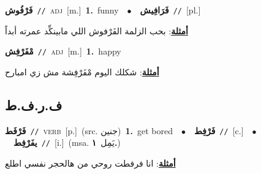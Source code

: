 \documentclass[10pt,a4paper,twoside]{article} %
\begin{document}
\begin{multicols}{2}
{\setlength\topsep{0pt}\textbf{\foreignlanguage{arabic}{فَرْفُوش}}\ {\color{gray}\texttt{//}\color{black}}\ \textsc{adj}\ [m.]\ \textbf{1.}~funny\ \ $\bullet$\ \ \setlength\topsep{0pt}\textbf{\foreignlanguage{arabic}{فَرَافِيش}}\ {\color{gray}\texttt{//}\color{black}}\ [pl.]\  \begin{flushright}\color{gray}\foreignlanguage{arabic}{\textbf{\underline{\foreignlanguage{arabic}{أمثلة}}}: بحب الزلمة الفَرْفوش اللي مابينكِّد عمرته أبداً}\end{flushright}\color{black}} \vspace{2mm}

{\setlength\topsep{0pt}\textbf{\foreignlanguage{arabic}{مْفَرْفِش}}\ {\color{gray}\texttt{//}\color{black}}\ \textsc{adj}\ [m.]\ \textbf{1.}~happy\  \begin{flushright}\color{gray}\foreignlanguage{arabic}{\textbf{\underline{\foreignlanguage{arabic}{أمثلة}}}: شكلك اليوم مْفَرْفِشة مش زي امبارح}\end{flushright}\color{black}} \vspace{2mm}

\vspace{-3mm}
\subsection*{\color{blue}\foreignlanguage{arabic}{ف.ر.ف.ط}\color{blue}{}} 

{\setlength\topsep{0pt}\textbf{\foreignlanguage{arabic}{فَرْفَط}}\ {\color{gray}\texttt{//}\color{black}}\ \textsc{verb}\ [p.]\ (src. \color{gray}\foreignlanguage{arabic}{جنين}\color{black})\ \textbf{1.}~get bored\ \ $\bullet$\ \ \setlength\topsep{0pt}\textbf{\foreignlanguage{arabic}{فَرْفِط}}\ {\color{gray}\texttt{//}\color{black}}\ [c.]\ \ $\bullet$\ \ \setlength\topsep{0pt}\textbf{\foreignlanguage{arabic}{يفَرْفِط}}\ {\color{gray}\texttt{//}\color{black}}\ [i.]\ \color{gray}(msa. \foreignlanguage{arabic}{يَمِل}~\foreignlanguage{arabic}{\textbf{١.}})\color{black}\  \begin{flushright}\color{gray}\foreignlanguage{arabic}{\textbf{\underline{\foreignlanguage{arabic}{أمثلة}}}: انا فرفطت روحي من هالحجر نفسي اطلع}\end{flushright}\color{black}} \vspace{2mm}


\end{multicols}
\end{document}
